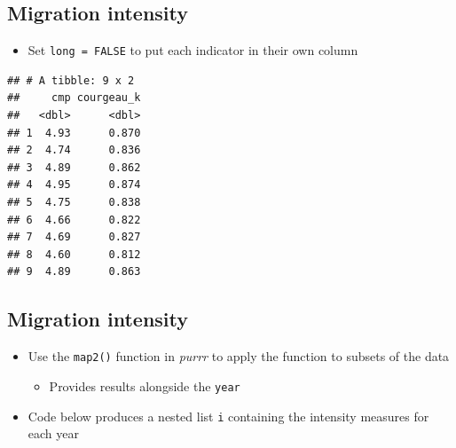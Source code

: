 \documentclass[
]{book}
\newenvironment{Shaded}{\begin{snugshade}}{\end{snugshade}}
\newcommand{\AttributeTok}[1]{\textcolor[rgb]{0.77,0.63,0.00}{#1}}
\newcommand{\ConstantTok}[1]{\textcolor[rgb]{0.00,0.00,0.00}{#1}}
\newcommand{\FunctionTok}[1]{\textcolor[rgb]{0.00,0.00,0.00}{#1}}
\newcommand{\NormalTok}[1]{#1}
\newcommand{\SpecialCharTok}[1]{\textcolor[rgb]{0.00,0.00,0.00}{#1}}
\providecommand{\tightlist}{%
  \setlength{\itemsep}{0pt}\setlength{\parskip}{0pt}}
\begin{document}
\hypertarget{migration-intensity-9}{%
\subsection{Migration intensity}\label{migration-intensity-9}}

\begin{itemize}
\tightlist
\item
  Set \texttt{long\ =\ FALSE} to put each indicator in their own column
\end{itemize}

\begin{Shaded}
\end{Shaded}

\begin{verbatim}
## # A tibble: 9 x 2
##     cmp courgeau_k
##   <dbl>      <dbl>
## 1  4.93      0.870
## 2  4.74      0.836
## 3  4.89      0.862
## 4  4.95      0.874
## 5  4.75      0.838
## 6  4.66      0.822
## 7  4.69      0.827
## 8  4.60      0.812
## 9  4.89      0.863
\end{verbatim}

\hypertarget{migration-intensity-10}{%
\subsection{Migration intensity}\label{migration-intensity-10}}

\begin{itemize}
\tightlist
\item
  Use the \texttt{map2()} function in \emph{purrr} to apply the function to subsets of the data

  \begin{itemize}
  \tightlist
  \item
    Provides results alongside the \texttt{year}
  \end{itemize}
\item
  Code below produces a nested list \texttt{i} containing the intensity measures for each year
\end{itemize}
\end{document}
